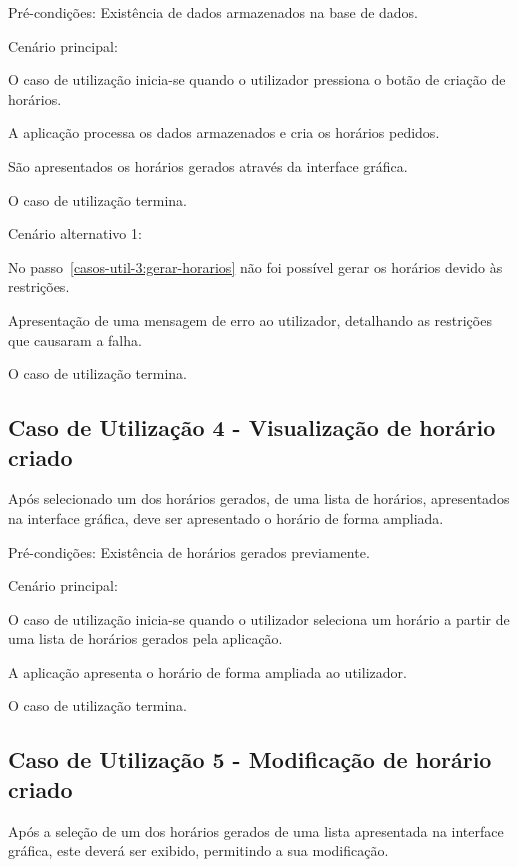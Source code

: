 Pré-condições: Existência de dados armazenados na base de dados.

Cenário principal:

\begin{compactenum}
    \item O caso de utilização inicia-se quando o utilizador pressiona o botão de criação de horários.
    \item A aplicação processa os dados armazenados e cria os horários pedidos. \label{casos-util-3:gerar-horarios}
    \item São apresentados os horários gerados através da interface gráfica.
    \item O caso de utilização termina.
\end{compactenum}

Cenário alternativo 1:

\begin{compactenum}
    \item No passo~\ref{casos-util-3:gerar-horarios} não foi possível gerar os horários devido às restrições.
    \item Apresentação de uma mensagem de erro ao utilizador, detalhando as restrições que causaram a falha.
    \item O caso de utilização termina.
\end{compactenum}

\subsection*{Caso de Utilização 4 - Visualização de horário criado}
Após selecionado um dos horários gerados, de uma lista de horários, apresentados na interface gráfica, deve ser apresentado o horário de forma ampliada.

Pré-condições: Existência de horários gerados previamente.

Cenário principal:

\begin{compactenum}
    \item O caso de utilização inicia-se quando o utilizador seleciona um horário a partir de uma lista de horários gerados pela aplicação.
    \item A aplicação apresenta o horário de forma ampliada ao utilizador.
    \item O caso de utilização termina.
\end{compactenum}

\subsection*{Caso de Utilização 5 - Modificação de horário criado}
Após a seleção de um dos horários gerados de uma lista apresentada na interface gráfica, este deverá ser exibido, permitindo a sua modificação.

